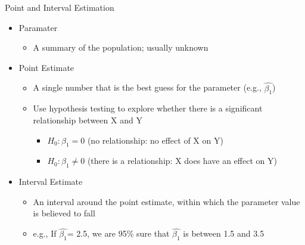 \documentclass[
  8pt,
  ignorenonframetext,
  dvipsnames]{beamer}
\providecommand{\tightlist}{%
  \setlength{\itemsep}{0pt}\setlength{\parskip}{0pt}}
\let\olditem\item
\renewcommand{\item}{%
  \olditem\vspace{4pt}
}
\begin{document}
\begin{frame}{Point and Interval Estimation}
\protect\hypertarget{point-and-interval-estimation}{}

\begin{itemize}
\tightlist
\item
  Paramater

  \begin{itemize}
  \tightlist
  \item
    A summary of the population; usually unknown
  \end{itemize}
\end{itemize}

\medskip

\begin{itemize}
\tightlist
\item
  Point Estimate

  \begin{itemize}
  \tightlist
  \item
    A single number that is the best guess for the parameter (e.g.,
    \(\hat{\beta_1}\))
  \item
    Use hypothesis testing to explore whether there is a significant
    relationship between X and Y

    \begin{itemize}
    \tightlist
    \item
      \(H_0: \beta_1 = 0\) (no relationship: no effect of X on Y)
    \item
      \(H_0: \beta_1 \ne 0\) (there is a relationship: X does have an
      effect on Y)
    \end{itemize}
  \end{itemize}
\end{itemize}

\medskip

\begin{itemize}
\tightlist
\item
  Interval Estimate

  \begin{itemize}
  \tightlist
  \item
    An interval around the point estimate, within which the parameter
    value is believed to fall
  \item
    e.g., If \(\hat{\beta_1}\)= 2.5, we are 95\% sure that
    \(\hat{\beta_1}\) is between 1.5 and 3.5
  \end{itemize}
\end{itemize}

\end{frame}
\end{document}
